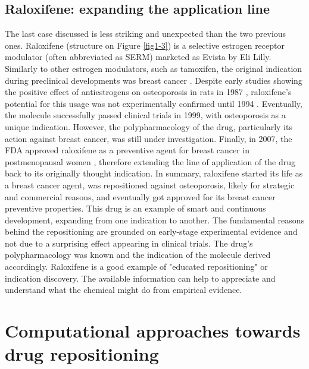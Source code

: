 \subsection{Raloxifene: expanding the application line}

The last case discussed is less striking and unexpected than the two previous ones. Raloxifene (structure on Figure \ref{fig1-3}) is a selective estrogen receptor modulator (often abbreviated as SERM) marketed as Evista by Eli Lilly. Similarly to other estrogen modulators, such as tamoxifen, the original indication during preclinical developments was breast cancer \citep{ashburn2004drug}. Despite early studies showing the positive effect of antiestrogens on osteoporosis in rats in 1987 \citep{jordan1987effects}, raloxifene's potential for this usage was not experimentally confirmed until 1994 \citep{black1994raloxifene}. Eventually, the molecule successfully passed clinical trials in 1999, with osteoporosis as a unique indication. However, the polypharmacology of the drug, particularly its action against breast cancer, was still under investigation. Finally, in 2007, the FDA approved raloxifene as a preventive agent for breast cancer in postmenopausal women \citep{fdaraloxifen}, therefore extending the line of application of the drug back to its originally thought indication. In summary, raloxifene started its life as a breast cancer agent, was repositioned against osteoporosis, likely for strategic and commercial reasons, and eventually got approved for its breast cancer preventive properties. This drug is an example of smart and continuous development, expanding from one indication to another. The fundamental reasons behind the repositioning are grounded on early-stage experimental evidence and not due to a surprising effect appearing in clinical trials. The drug's polypharmacology was known and the indication of the molecule derived accordingly. Raloxifene is a good example of "educated repositioning" or indication discovery. The available information can help to appreciate and understand what the chemical might do from empirical evidence.

\section{Computational approaches towards drug repositioning}
\label{approaches}

